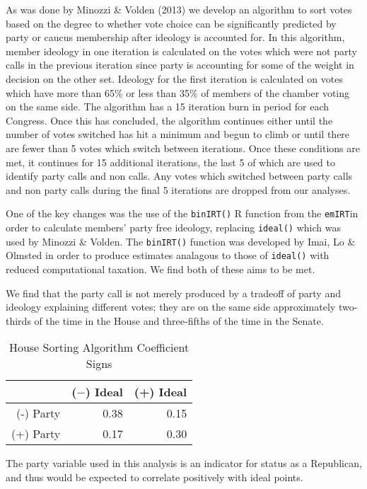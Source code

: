 \documentclass[12pt]{article}
\newcommand\fnote[1]{\captionsetup{font=small}\caption*{#1}}
\begin{document}
As was done by Minozzi \& Volden (2013) we develop an algorithm to sort votes based on the degree to whether vote choice can be significantly predicted by party or caucus membership after ideology is accounted for. In this algorithm, member ideology in one iteration is calculated on the votes which were not party calls in the previous iteration since party is accounting for some of the weight in decision on the other set. Ideology for the first iteration is calculated on votes which have more than 65\% or less than 35\% of members of the chamber voting on the same side. The algorithm has a 15 iteration burn in period for each Congress. Once this has concluded, the algorithm continues either until the number of votes switched has hit a minimum and begun to climb or until there are fewer than 5 votes which switch between iterations. Once these conditions are met, it continues for 15 additional iterations, the last 5 of which are used to identify party calls and non calls. Any votes which switched between party calls and non party calls during the final 5 iterations are dropped from our analyses.

One of the key changes was the use of the \verb|binIRT()| R function from the \verb|emIRT|in order to calculate members' party free ideology, replacing \verb|ideal()| which was used by Minozzi \& Volden. The \verb|binIRT()| function was developed by Imai, Lo \& Olmsted in order to produce estimates analagous to those of \verb|ideal()| with reduced computational taxation. We find both of these aims to be met.

We find that the party call is not merely produced by a tradeoff of party and ideology explaining different votes; they are on the same side approximately two-thirds of the time in the House and three-fifths of the time in the Senate.

\begin{table}[H]
	\centering
	\singlespacing
	\caption{House Sorting Algorithm Coefficient Signs}
	\begin{tabular}{rrr}
		\hline
		& ($-$) Ideal & (+) Ideal \\ 
		\hline
		(-) Party & 0.38 & 0.15 \\ 
		(+) Party & 0.17 & 0.30 \\ 
		\hline
	\end{tabular}
	\fnote{The party variable used in this analysis is an indicator for status as a Republican, and thus would be expected to correlate positively with ideal points.}
\end{table}
\end{document}
